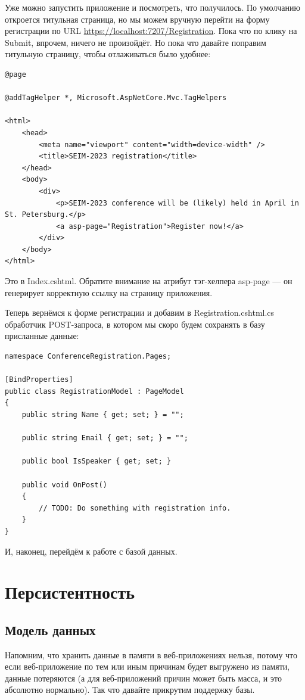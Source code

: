 \documentclass{../../text-style}
\begin{document}
Уже можно запустить приложение и посмотреть, что получилось. По умолчанию откроется титульная страница, но мы можем вручную перейти на форму регистрации по URL \url{https://localhost:7207/Registration}. Пока что по клику на Submit, впрочем, ничего не произойдёт. Но пока что давайте поправим титульную страницу, чтобы отлаживаться было удобнее:

\begin{verbatim}
@page

@addTagHelper *, Microsoft.AspNetCore.Mvc.TagHelpers

<html>
    <head>
        <meta name="viewport" content="width=device-width" />
        <title>SEIM-2023 registration</title>
    </head>
    <body>
        <div>
            <p>SEIM-2023 conference will be (likely) held in April in St. Petersburg.</p>
            <a asp-page="Registration">Register now!</a>
        </div>
    </body>
</html>
\end{verbatim}

Это в Index.cshtml. Обратите внимание на атрибут тэг-хелпера asp-page --- он генерирует корректную ссылку на страницу приложения.

Теперь вернёмся к форме регистрации и добавим в Registration.cshtml.cs обработчик POST-запроса, в котором мы скоро будем сохранять в базу присланные данные:

\begin{verbatim}
namespace ConferenceRegistration.Pages;

[BindProperties]
public class RegistrationModel : PageModel
{
    public string Name { get; set; } = "";

    public string Email { get; set; } = "";

    public bool IsSpeaker { get; set; }

    public void OnPost()
    {
        // TODO: Do something with registration info.
    }
}
\end{verbatim}

И, наконец, перейдём к работе с базой данных.

\section{Персистентность}

\subsection{Модель данных}

Напомним, что хранить данные в памяти в веб-приложениях нельзя, потому что если веб-приложение по тем или иным причинам будет выгружено из памяти, данные потеряются (а для веб-приложений причин может быть масса, и это абсолютно нормально). Так что давайте прикрутим поддержку базы. 
\end{document}

